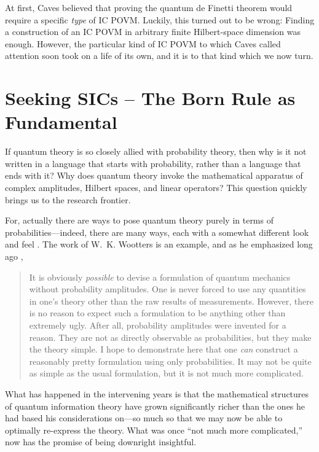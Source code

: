 \documentclass[aps,pra,superscriptaddress,12pt,tightenlines,nofootinbib]{revtex4-2}
\begin{document}
At first, Caves believed that proving the quantum de Finetti theorem would require a specific {\it type\/} of IC POVM.  Luckily, this turned out to be wrong:  Finding a construction of an IC POVM in arbitrary finite Hilbert-space dimension was enough.  However, the particular kind of IC POVM to which Caves called attention soon took on a life of its own, and it is to that kind which we now turn.

\section{Seeking SICs -- The Born Rule as Fundamental}

\label{SeekingSICs}

If quantum theory is so closely allied with probability theory, then why is it not written in a language that starts with probability, rather than a language that ends with it?  Why does quantum theory invoke the mathematical apparatus of complex amplitudes, Hilbert spaces, and linear operators?  This question quickly brings us to the research frontier.

For, actually there are ways to pose quantum theory purely in terms of probabilities---indeed, there are many ways, each with a somewhat different look and feel \cite{Ferrie09}.  The work of W.~K. Wootters is an example, and as he emphasized long ago \cite{Wootters86},
\begin{quote}
\noindent It is obviously {\it possible\/} to devise a formulation of quantum mechanics
without probability amplitudes. One is never forced to use any quantities in
one's theory other than the raw results of measurements. However, there is
no reason to expect such a formulation to be anything other than
extremely ugly. After all, probability amplitudes were invented for a reason.
They are not as directly observable as probabilities, but they make the
theory simple. I hope to demonstrate here that one {\it can\/} construct a
reasonably pretty formulation using only probabilities. It may not be quite
as simple as the usual formulation, but it is not much more complicated.
\end{quote}
What has happened in the intervening years is that the mathematical structures of quantum information theory have grown significantly richer than the ones he had based his considerations on---so much so that we may now be able to optimally re-express the theory.  What was once ``not much more complicated,'' now has the promise of being downright insightful.
\end{document}
